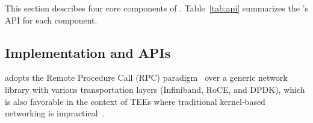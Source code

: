 

This section describes four core components of \projecttitle{}. Table~\ref{tab:api} summarizes the \projecttitle{}'s API for each component.%






\subsection{\projecttitle Implementation and APIs}
\label{sec:recipe_impl_apis}
\label{subsec:networkin}
\projecttitle{} adopts the Remote Procedure Call (RPC) paradigm~\cite{286500} over a generic network library with various transportation layers (Infiniband, RoCE, and DPDK), which is also favorable in the context of TEEs where traditional kernel-based networking is impractical~\cite{kuvaiskii2017sgxbounds}. %



